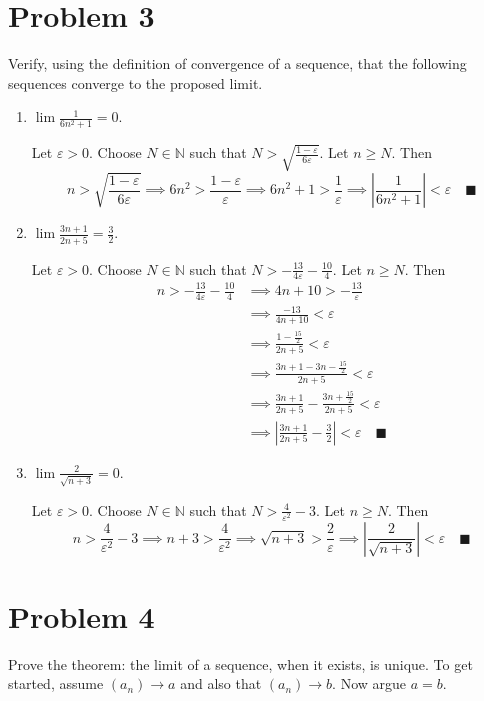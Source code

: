 \documentclass[11pt]{article}
\numberwithin{equation}{section}
\theoremstyle{definition}
\theoremstyle{remark}
\newcommand{\ep}{\varepsilon}
\newcommand{\N}{\mathbb{N}}
\renewcommand{\qed}{\quad \blacksquare}
\newcommand{\abs}[1]{\left\vert #1 \right\vert}
\begin{document}
\section*{Problem 3}
Verify, using the definition of convergence of a sequence, that the following sequences converge to the proposed limit.
\begin{enumerate}
	\item $\lim\frac{1}{6n^2+1}=0$.
	
        \color{blue}
            Let $\ep > 0$. Choose $N \in \N$ such that $N > \sqrt{\frac{1 - \ep}{6\ep}}$. Let $n \geq N$. Then
            \[n > \sqrt{\frac{1 - \ep}{6\ep}} \implies 6n^2 > \frac{1 - \ep}{\ep} \implies 6n^2 + 1 > \frac{1}{\ep} \implies \abs{\frac{1}{6n^2 + 1}} < \ep \qed\]
        \color{black}

	\item $\lim\frac{3n+1}{2n+5}=\frac{3}{2}$.

        \color{blue}
            Let $\ep > 0$. Choose $N \in \N$ such that $N > -\frac{13}{4\ep} - \frac{10}{4}$. Let $n \geq N$. Then 
            \begin{align*}
                n > -\frac{13}{4\ep} - \frac{10}{4} &\implies 4n + 10 > -\frac{13}{\ep} \\ 
                &\implies \frac{-13}{4n + 10} < \ep\\ 
                &\implies \frac{1 - \frac{15}{2}}{2n + 5} < \ep\\
                & \implies \frac{3n + 1 - 3n - \frac{15}{2}}{2n + 5} < \ep\\ 
                & \implies \frac{3n + 1}{2n + 5} - \frac{3n + \frac{15}{2}}{2n + 5} < \ep\\
                &\implies \abs{\frac{3n + 1}{2n + 5} - \frac{3}{2}} < \ep \qed
            \end{align*}
            
        \color{black}

	\item $\lim\frac{2}{\sqrt{n+3}}=0$.
	
        \color{blue}
            Let $\ep > 0$. Choose $N \in \N$ such that $N > \frac{4}{\ep^2} - 3$. Let $n \geq N$. Then
            \[n > \frac{4}{\ep^2} - 3 \implies n + 3 > \frac{4}{\ep^2} \implies \sqrt{n + 3} > \frac{2}{\ep} \implies \abs{\frac{2}{\sqrt{n + 3}}} < \ep \qed\]
        \color{black}
\end{enumerate}

\pagebreak

\section*{Problem 4}
Prove the theorem: the limit of a sequence, when it exists, is unique. To get started, assume $(a_n) \to a$ and also that $(a_n) \to b$. Now argue $a = b$.
\end{document}
